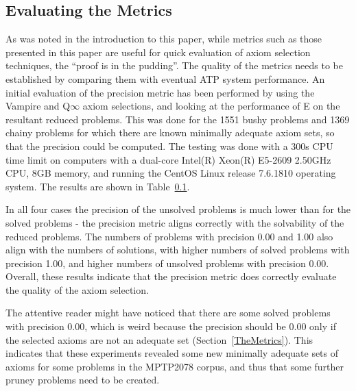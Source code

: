 \documentclass[EPiC]{easychair}
\begin{document}
\subsection{Evaluating the Metrics}
\label{EvaluationOfMetrics}

As was noted in the introduction to this paper, while metrics such as
those presented in this paper are useful for quick evaluation of axiom
selection techniques, the ``proof is in the pudding''.
The quality of the metrics needs to be established by comparing them with 
eventual ATP system performance.
An initial evaluation of the precision metric has been performed by using
the Vampire and Q$\infty$ axiom selections, and looking at the performance 
of E on the resultant reduced problems.
This was done for the 1551 bushy problems and 1369 chainy problems for
which there are known minimally adequate axiom sets, so that the precision 
could be computed.
The testing was done with a 300s CPU time limit on 
computers with a dual-core Intel(R) Xeon(R) E5-2609 2.50GHz CPU,
8GB memory, and running the CentOS Linux release 7.6.1810 operating system.
The results are shown in Table~\ref{EvaluationOfMetrics}.

In all four cases the precision of the unsolved problems is much lower than for 
the solved problems - the precision metric aligns correctly with the solvability 
of the reduced problems.
The numbers of problems with precision 0.00 and 1.00 also align with the numbers
of solutions, with higher numbers of solved problems with precision 1.00, and
higher numbers of unsolved problems with precision 0.00.
Overall, these results indicate that the precision metric does correctly
evaluate the quality of the axiom selection.

The attentive reader might have noticed that there are some solved problems with
precision 0.00, which is weird because the precision should be 0.00 only if the 
selected axioms are not an adequate set (Section~\ref{TheMetrics}).
This indicates that these experiments revealed some new minimally adequate 
sets of axioms for some problems in the MPTP2078 corpus, and thus that some 
further pruney problems need to be created.
\end{document}
